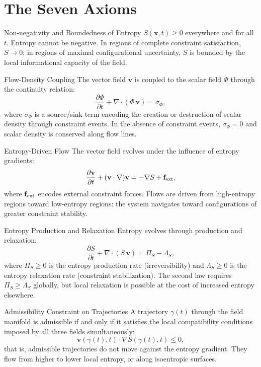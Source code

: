 \section{The Seven Axioms}

\begin{axiom}{Non-negativity and Boundedness of Entropy}
$S(\mathbf{x},t) \geq 0$ everywhere and for all $t$. Entropy cannot be negative.
In regions of complete constraint satisfaction, $S \to 0$; in regions of maximal
configurational uncertainty, $S$ is bounded by the local informational capacity
of the field.
\end{axiom}

\begin{axiom}{Flow-Density Coupling}
The vector field $\mathbf{v}$ is coupled to the scalar field $\Phi$ through
the continuity relation:
\[
  \frac{\partial \Phi}{\partial t} + \nabla \cdot (\Phi\, \mathbf{v}) = \sigma_\Phi,
\]
where $\sigma_\Phi$ is a source/sink term encoding the creation or destruction of
scalar density through constraint events. In the absence of constraint events,
$\sigma_\Phi = 0$ and scalar density is conserved along flow lines.
\end{axiom}

\begin{axiom}{Entropy-Driven Flow}
The vector field evolves under the influence of entropy gradients:
\[
  \frac{\partial \mathbf{v}}{\partial t} + (\mathbf{v}\cdot\nabla)\mathbf{v}
  = -\nabla S + \mathbf{f}_{\rm ext},
\]
where $\mathbf{f}_{\rm ext}$ encodes external constraint forces. Flows are
driven from high-entropy regions toward low-entropy regions: the system
navigates toward configurations of greater constraint stability.
\end{axiom}

\begin{axiom}{Entropy Production and Relaxation}
Entropy evolves through production and relaxation:
\[
  \frac{\partial S}{\partial t} + \nabla \cdot (S\,\mathbf{v})
  = \Pi_S - \Lambda_S,
\]
where $\Pi_S \geq 0$ is the entropy production rate (irreversibility) and
$\Lambda_S \geq 0$ is the entropy relaxation rate (constraint stabilization).
The second law requires $\Pi_S \geq \Lambda_S$ globally, but local relaxation
is possible at the cost of increased entropy elsewhere.
\end{axiom}

\begin{axiom}{Admissibility Constraint on Trajectories}
A trajectory $\gamma(t)$ through the \RSVP field manifold is admissible if and
only if it satisfies the local compatibility conditions imposed by all three
fields simultaneously:
\[
  \mathbf{v}(\gamma(t),t) \cdot \nabla S(\gamma(t),t) \leq 0,
\]
that is, admissible trajectories do not move against the entropy gradient. They
flow from higher to lower local entropy, or along isoentropic surfaces.
\end{axiom}

